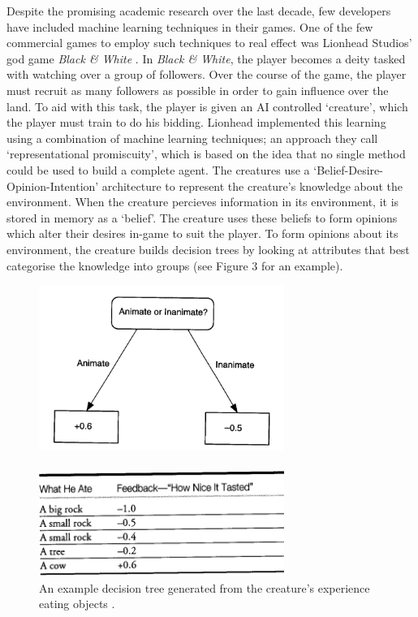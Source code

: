 \documentclass[a4paper,oneside]{report}
\begin{document}
Despite the promising academic research over the last decade, few developers have included machine learning techniques in their games. One of the few commercial games to employ such techniques to real effect was Lionhead Studios' god game \emph{Black \& White} \cite{:hc}. In \emph{Black \& White}, the player becomes a deity tasked with watching over a group of followers. Over the course of the game, the player must recruit as many followers as possible in order to gain influence over the land. To aid with this task, the player is given an AI controlled `creature', which the player must train to do his bidding. Lionhead implemented this learning using a combination of machine learning techniques; an approach they call `representational promiscuity', which is based on the idea that no single method could be used to build a complete agent. The creatures use a `Belief-Desire-Opinion-Intention' architecture to represent the creature's knowledge about the environment. When the creature percieves information in its environment, it is stored in memory as a `belief'. The creature uses these beliefs to form opinions which alter their desires in-game to suit the player. To form opinions about its environment, the creature builds decision trees by looking at attributes that best categorise the knowledge into groups (see Figure 3 for an example).

\begin{figure}[h!]
	\centering
		\includegraphics[width=80mm]{sources/images/TastyTree}\paragraph{}
    	\includegraphics[width=80mm]{sources/images/TastyTable}
    	\caption{An example decision tree generated from the creature's experience eating objects \cite{:hc}.}
\end{figure}
\end{document}
